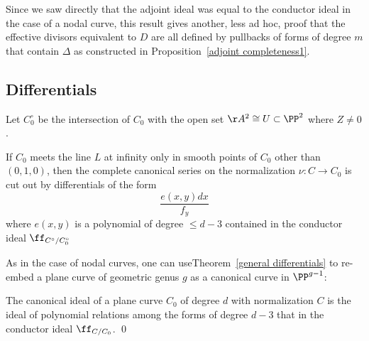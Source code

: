 Since we saw directly that the adjoint ideal was equal to the conductor ideal in the case of
a nodal curve, this result gives another, less ad hoc, proof that the effective divisors equivalent to $D$
are all defined by
pullbacks of forms of degree $m$ that contain $\Delta$
as constructed in Proposition~\ref{adjoint completeness1}.

\subsection{Differentials}

Let $C^\circ_0$ be the intersection of $C_0$ with the open set $\AA^{2}\cong U\subset \PP^{2}$ where $Z \neq 0$.

\begin{theorem}\label{general differentials}
If $C_{0}$ meets the line $L$ at infinity only in smooth points of $C_{0}$ other than $(0,1,0)$, then the complete canonical series on the normalization $\nu: C \to C_{0}$ is cut out by differentials of the form
$$
 \frac{e(x,y)dx}{f_{y}}
$$
where $e(x,y)$ is a polynomial of degree $\leq d-3$ contained in the 
conductor ideal $\ff_{C^{\circ}/C_{0}^{\circ}}$
\end{theorem}

As in the case of nodal curves, one can useTheorem~\ref{general differentials} to re-embed a plane curve of 
geometric genus $g$ as a canonical
curve in $\PP^{g-1}$:

\begin{corollary}
 The canonical ideal of a plane curve $C_{0}$ of degree $d$ with normalization $C$ 
 is the ideal of polynomial relations
 among the forms of degree $d-3$ that in the conductor ideal $\ff_{C/C_{0}}$. \qed
\end{corollary}

